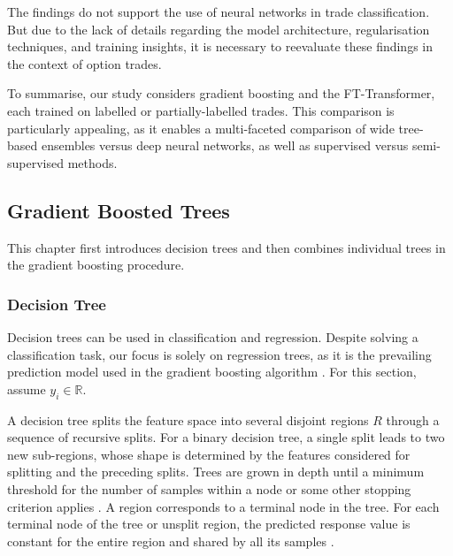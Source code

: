 The findings \textcite[][50]{ronenMachineLearningTrade2022} do not support the use of neural networks in trade classification. But due to the lack of details regarding the model architecture, regularisation techniques, and training insights, it is necessary to reevaluate these findings in the context of option trades.

To summarise, our study considers gradient boosting and the FT-Transformer, each trained on labelled or partially-labelled trades. This comparison is particularly appealing, as it enables a multi-faceted comparison of wide tree-based ensembles versus deep neural networks, as well as supervised versus semi-supervised methods.

\subsection{Gradient Boosted Trees}\label{sec:gradient-boosted-trees}

This chapter first introduces decision trees and then combines individual trees in the gradient boosting procedure.

\subsubsection{Decision Tree}\label{sec:decision-tree}

Decision trees can be used in classification and regression. Despite solving a classification task, our focus is solely on regression trees, as it is the prevailing prediction model used in the gradient boosting algorithm \autocite[][9]{friedmanAdditiveLogisticRegression2000}. For this section, assume $y_i \in \mathbb{R}$.

A decision tree splits the feature space into several disjoint regions $R$ through a sequence of recursive splits. For a binary decision tree, a single split leads to two new sub-regions, whose shape is determined by the features considered for splitting and the preceding splits. Trees are grown in depth until a minimum threshold for the number of samples within a node or some other stopping criterion applies \autocite[][42]{breimanClassificationRegressionTrees2017}.
A region corresponds to a terminal node in the tree. For each terminal node of the tree or unsplit region, the predicted response value is constant for the entire region and shared by all its samples \autocite[][229]{breimanClassificationRegressionTrees2017}.

